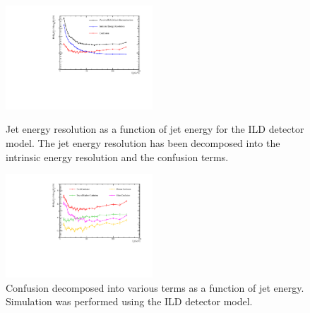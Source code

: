 \documentclass[final,3p,times,twocolumn]{elsarticle}
\begin{document}
\begin{figure}[!h]
  \begin{center}
     \includegraphics[width=0.49\textwidth]{3_Implementation/DetailedPlot.pdf}
     \caption{Jet energy resolution as a function of jet energy for the ILD detector model.  The jet energy resolution has been decomposed into the intrinsic energy resolution and the confusion terms.  \label{2-Decomp}}
  \end{center}
    \begin{center}
     \includegraphics[width=0.49\textwidth]{3_Implementation/Confusion.pdf}
     \caption{Confusion decomposed into various terms as a function of jet energy.  Simulation was performed using the ILD detector model.  \label{2-Conf}}
  \end{center}
\end{figure}

\end{document}
